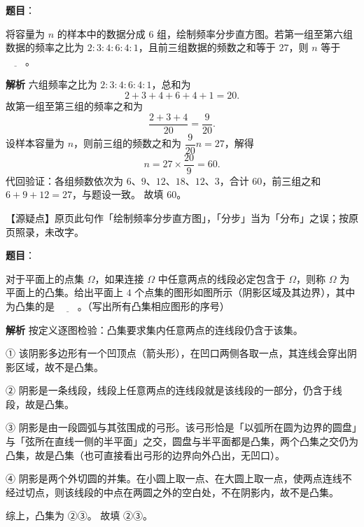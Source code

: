 \begin{answer}

\textbf{题目}：

将容量为 $n$ 的样本中的数据分成 $6$ 组，绘制频率分步直方图。若第一组至第六组数据的频率之比为 $2:3:4:6:4:1$，且前三组数据的频数之和等于 $27$，则 $n$ 等于 $\underline{\qquad}$。

\textbf{解析}
六组频率之比为 $2:3:4:6:4:1$，总和为
\nopagebreak[4]
\[2+3+4+6+4+1=20.\]
故第一组至第三组的频率之和为
\nopagebreak[4]
\[\frac{2+3+4}{20}=\frac9{20}.\]
设样本容量为 $n$，则前三组的频数之和为 $\dfrac9{20}n=27$，解得
\nopagebreak[4]
\[n=27\times\frac{20}{9}=60.\]
代回验证：各组频数依次为 $6$、$9$、$12$、$18$、$12$、$3$，合计 $60$，前三组之和 $6+9+12=27$，与题设一致。
故填 $60$。

【源疑点】原页此句作「绘制频率分步直方图」，「分步」当为「分布」之误；按原页照录，未改字。


\end{answer}
\begin{answer}

\textbf{题目}：

对于平面上的点集 $\Omega$，如果连接 $\Omega$ 中任意两点的线段必定包含于 $\Omega$，则称 $\Omega$ 为平面上的凸集。给出平面上 $4$ 个点集的图形如图所示（阴影区域及其边界），其中为凸集的是 $\underline{\qquad}$。（写出所有凸集相应图形的序号）
\nopagebreak[4]
\begin{center}\end{center}
\nopagebreak[4]
\textbf{解析}
按定义逐图检验：凸集要求集内任意两点的连线段仍含于该集。

① 该阴影多边形有一个凹顶点（箭头形），在凹口两侧各取一点，其连线会穿出阴影区域，故不是凸集。

② 阴影是一条线段，线段上任意两点的连线段就是该线段的一部分，仍含于线段，故是凸集。

③ 阴影是由一段圆弧与其弦围成的弓形。该弓形恰是「以弧所在圆为边界的圆盘」与「弦所在直线一侧的半平面」之交，圆盘与半平面都是凸集，两个凸集之交仍为凸集，故是凸集（也可直接看出弓形的边界向外凸出，无凹口）。

④ 阴影是两个外切圆的并集。在小圆上取一点、在大圆上取一点，使两点连线不经过切点，则该线段的中点在两圆之外的空白处，不在阴影内，故不是凸集。

综上，凸集为 ②③。
故填 ②③。


\end{answer}
